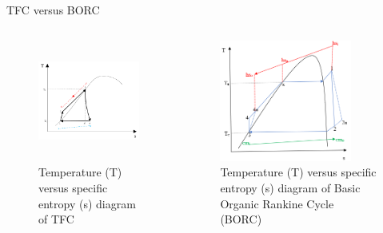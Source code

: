 \begin{frame}{TFC versus BORC}
\begin{columns}
    \begin{figure}[h]
      \centering
      \includegraphics[height=4cm]{images/tfctsdiagram.png}
      \caption{\scriptsize \centering Temperature (T) versus specific entropy (s) diagram of TFC \cite{smith2014power}}
   \end{figure}
    \begin{figure}[h]
    \centering
    \includegraphics[height=4cm]{images/borctsdiagram.png}
    \caption{\scriptsize \centering Temperature (T) versus specific entropy (s) diagram of Basic Organic Rankine Cycle (BORC)}
    \end{figure}
\end{columns}
\end{frame}

